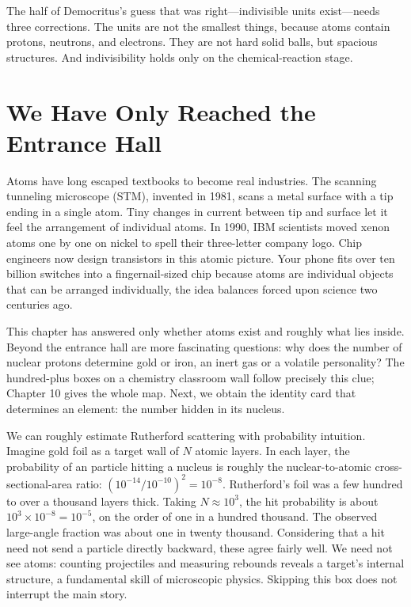 The half of Democritus's guess that was right---indivisible units exist---needs three corrections. The units are not the smallest things, because atoms contain protons, neutrons, and electrons. They are not hard solid balls, but spacious structures. And indivisibility holds only on the chemical-reaction stage.

\section{We Have Only Reached the Entrance Hall}

Atoms have long escaped textbooks to become real industries. The scanning tunneling microscope (STM), invented in 1981, scans a metal surface with a tip ending in a single atom. Tiny changes in current between tip and surface let it feel the arrangement of individual atoms. In 1990, IBM scientists moved xenon atoms one by one on nickel to spell their three-letter company logo. Chip engineers now design transistors in this atomic picture. Your phone fits over ten billion switches into a fingernail-sized chip because atoms are individual objects that can be arranged individually, the idea balances forced upon science two centuries ago.

This chapter has answered only whether atoms exist and roughly what lies inside. Beyond the entrance hall are more fascinating questions: why does the number of nuclear protons determine gold or iron, an inert gas or a volatile personality? The hundred-plus boxes on a chemistry classroom wall follow precisely this clue; Chapter 10 gives the whole map. Next, we obtain the identity card that determines an element: the number hidden in its nucleus.

\begin{tiaozhan}
We can roughly estimate Rutherford scattering with probability intuition. Imagine gold foil as a target wall of $N$ atomic layers. In each layer, the probability of an \chem{\alpha} particle hitting a nucleus is roughly the nuclear-to-atomic cross-sectional-area ratio: $(10^{-14}/10^{-10})^2 = 10^{-8}$. Rutherford's foil was a few hundred to over a thousand layers thick. Taking $N \approx 10^3$, the hit probability is about $10^3 \times 10^{-8} = 10^{-5}$, on the order of one in a hundred thousand. The observed large-angle fraction was about one in twenty thousand. Considering that a hit need not send a particle directly backward, these agree fairly well. We need not see atoms: counting projectiles and measuring rebounds reveals a target's internal structure, a fundamental skill of microscopic physics. Skipping this box does not interrupt the main story.
\end{tiaozhan}

